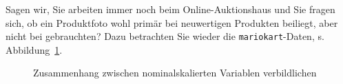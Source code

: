 \documentclass[
  letterpaper,
]{scrbook}
\theoremstyle{definition}
\theoremstyle{definition}
\theoremstyle{definition}
\theoremstyle{remark}
\begin{document}
Sagen wir, Sie arbeiten immer noch beim Online-Auktionshaus und Sie
fragen sich, ob ein Produktfoto wohl primär bei neuwertigen Produkten
beiliegt, aber nicht bei gebrauchten? Dazu betrachten Sie wieder die
\texttt{mariokart}-Daten, s. Abbildung~\ref{fig-zshg-nom1}.

\begin{figure}

\begin{minipage}{0.50\linewidth}



\end{minipage}%
%
\begin{minipage}{0.50\linewidth}



\end{minipage}%

\caption{\label{fig-zshg-nom1}Zusammenhang zwischen nominalskalierten
Variablen verbildlichen}

\end{figure}%
\end{document}

